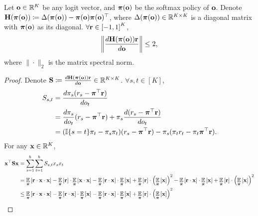 \begin{lem}
\label{lem:Hr_spectral_norm_upper_bound}
    Let ${\mathbf{o}} \in {\mathbb{R}}^K$ be any logit vector, and ${\boldsymbol{\pi}}({\mathbf{o}})$ be the softmax policy of ${\mathbf{o}}$. Denote ${\mathbf{H}}( {\boldsymbol{\pi}} ({\mathbf{o}} ) ) \coloneqq \Delta ( {\boldsymbol{\pi}} ({\mathbf{o}} ) ) - {\boldsymbol{\pi}} ({\mathbf{o}} ) {\boldsymbol{\pi}} ({\mathbf{o}} )^\top$, where $\Delta ( {\boldsymbol{\pi}} ({\mathbf{o}} ) ) \in {\mathbb{R}}^{K \times K}$ is a diagonal matrix with ${\boldsymbol{\pi}} ({\mathbf{o}} )$ as its diagonal. $\forall {\mathbf{r}} \in \left[ -1, 1\right]^K$,
\begin{equation*}
    \left\| \frac{d {\mathbf{H}}( {\boldsymbol{\pi}} ({\mathbf{o}} ) ) {\mathbf{r}}}{d {\mathbf{o}} } \right\| \le 2,
\end{equation*}
where $\| \cdot \|_2$ is the matrix spectral norm.
\end{lem}
\begin{proof}
    Denote ${\mathbf{S}} \coloneqq \frac{d {\mathbf{H}}( {\boldsymbol{\pi}} ({\mathbf{o}} ) ) {\mathbf{r}}}{d {\mathbf{o}} } \in {\mathbb{R}}^{K \times K}$. $\forall s, t \in [K]$,
\begin{equation*}
\begin{split}
    S_{s, t} &= \frac{d \pi_{s} ( r_{s} - {\boldsymbol{\pi}}^\top {\mathbf{r}} ) }{d o_{t}} \\
    &= \frac{d \pi_{s} }{d o_{t}} ( r_{s} - {\boldsymbol{\pi}}^\top {\mathbf{r}} ) + \pi_{s} \frac{d ( r_{s} - {\boldsymbol{\pi}}^\top {\mathbf{r}} ) }{d o_{t}} \\
    &= ( {\mathbb{I}}\{ s = t\} \pi_{t} -  \pi_{s } \pi_{t} ) ( r_{s} - {\boldsymbol{\pi}}^\top {\mathbf{r}} ) - \pi_{s} ( \pi_{t} r_{t} - \pi_{t} {\boldsymbol{\pi}}^\top {\mathbf{r}} ).
\end{split}
\end{equation*}
For any ${\mathbf{x}} \in {\mathbb{R}}^K$, 
\begin{equation*}
\begin{split}
    \rvx^\top \rmS \rvx &= \sum\limits_{s=1}^{h}{ \sum\limits_{t=1}^{h}{ S_{s,t} x_s x_t} } \\
    &= \expectation\limits_{\rvpi}\left[ \rvr \cdot \rvx \cdot \rvx \right] - \expectation\limits_{\rvpi}\left[ \rvr \right] \cdot \expectation\limits_{\rvpi}\left[ \rvx \cdot \rvx \right] - \expectation\limits_{\rvpi}\left[ \rvr \cdot \rvx \right] \cdot \expectation\limits_{\rvpi}\left[ \rvx \right] + \expectation\limits_{\rvpi}\left[ \rvr \right] \cdot \left( \expectation\limits_{\rvpi}\left[ \rvx \right] \right)^2  - \expectation\limits_{\rvpi}\left[ \rvr \cdot \rvx \right] \cdot \expectation\limits_{\rvpi}\left[ \rvx \right] + \expectation\limits_{\rvpi}\left[ \rvr \right] \cdot \left( \expectation\limits_{\rvpi}\left[ \rvx \right] \right)^2 \\
    &\le \expectation\limits_{\rvpi}\left[ \rvr \cdot \rvx \cdot \rvx \right] - \expectation\limits_{\rvpi}\left[ \rvr \cdot \rvx \right] \cdot \expectation\limits_{\rvpi}\left[ \rvx \right] - \expectation\limits_{\rvpi}\left[ \rvr \cdot \rvx \right] \cdot \expectation\limits_{\rvpi}\left[ \rvx \right] + \expectation\limits_{\rvpi}\left[ \rvr \right] \cdot \left( \expectation\limits_{\rvpi}\left[ \rvx \right] \right)^2 \\

\end{split}
\end{equation*}
\end{proof}
